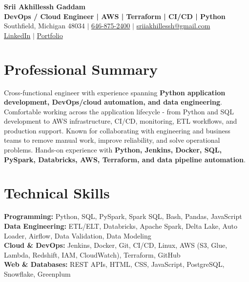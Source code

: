 \documentclass[letterpaper,10pt]{article}
\begin{document}
\fontsize{9.35pt}{10.45pt}\selectfont

\begin{center}
    {\LARGE \textbf{Srii Akhillessh Gaddam}} \\[-1pt]
    \textbf{DevOps / Cloud Engineer | AWS | Terraform | CI/CD | Python} \\[2pt]
    Southfield, Michigan 48034 $|$
    \href{tel:6468752400}{646-875-2400} $|$
    \href{mailto:sriiakhillessh@gmail.com}{sriiakhillessh@gmail.com} \\[1pt]
    \href{https://www.linkedin.com/in/srii-akhiilessh-gaddam-b48668191/}{LinkedIn} $|$
    \href{https://sriiakhillesshg.github.io/portfolio/}{Portfolio}
\end{center}
\vspace{-8pt}

\section{Professional Summary}
\small{Cross-functional engineer with experience spanning \textbf{Python application development, DevOps/cloud automation, and data engineering}. Comfortable working across the application lifecycle - from Python and SQL development to AWS infrastructure, CI/CD, monitoring, ETL workflows, and production support. Known for collaborating with engineering and business teams to remove manual work, improve reliability, and solve operational problems. Hands-on experience with \textbf{Python, Jenkins, Docker, SQL, PySpark, Databricks, AWS, Terraform, and data pipeline automation}.}

\section{Technical Skills}
\small{
\textbf{Programming:} Python, SQL, PySpark, Spark SQL, Bash, Pandas, JavaScript \\
\textbf{Data Engineering:} ETL/ELT, Databricks, Apache Spark, Delta Lake, Auto Loader, Airflow, Data Validation, Data Modeling \\
\textbf{Cloud \& DevOps:} Jenkins, Docker, Git, CI/CD, Linux, AWS (S3, Glue, Lambda, Redshift, IAM, CloudWatch), Terraform, GitHub \\
\textbf{Web \& Databases:} REST APIs, HTML, CSS, JavaScript, PostgreSQL, Snowflake, Greenplum
}
\end{document}
